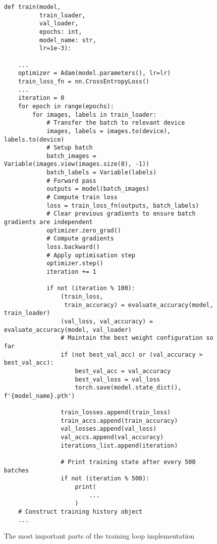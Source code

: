 \newpage
\begin{figure}[H]
    \centering
    \begin{verbatim}
def train(model,
          train_loader,
          val_loader,
          epochs: int,
          model_name: str,
          lr=1e-3):

    ...
    optimizer = Adam(model.parameters(), lr=lr)
    train_loss_fn = nn.CrossEntropyLoss()
    ...
    iteration = 0
    for epoch in range(epochs):
        for images, labels in train_loader:
            # Transfer the batch to relevant device
            images, labels = images.to(device), labels.to(device)
            # Setup batch
            batch_images = Variable(images.view(images.size(0), -1))
            batch_labels = Variable(labels)
            # Forward pass
            outputs = model(batch_images)
            # Compute train loss
            loss = train_loss_fn(outputs, batch_labels)
            # Clear previous gradients to ensure batch gradients are independent
            optimizer.zero_grad()
            # Compute gradients
            loss.backward()
            # Apply optimisation step
            optimizer.step()
            iteration += 1
            
            if not (iteration % 100):
                (train_loss,
                 train_accuracy) = evaluate_accuracy(model, train_loader)
                (val_loss, val_accuracy) = evaluate_accuracy(model, val_loader)
                # Maintain the best weight configuration so far
                if (not best_val_acc) or (val_accuracy > best_val_acc):
                    best_val_acc = val_accuracy
                    best_val_loss = val_loss
                    torch.save(model.state_dict(), f'{model_name}.pth')

                train_losses.append(train_loss)
                train_accs.append(train_accuracy)
                val_losses.append(val_loss)
                val_accs.append(val_accuracy)
                iterations_list.append(iteration)
                
                # Print training state after every 500 batches
                if not (iteration % 500):
                    print(
                        ...
                    )
    # Construct training history object
    ...
    \end{verbatim}
    \caption{The most important parts of the training loop implementation}
    \label{fig:experiments:clssification:implementation:loop}
\end{figure}
